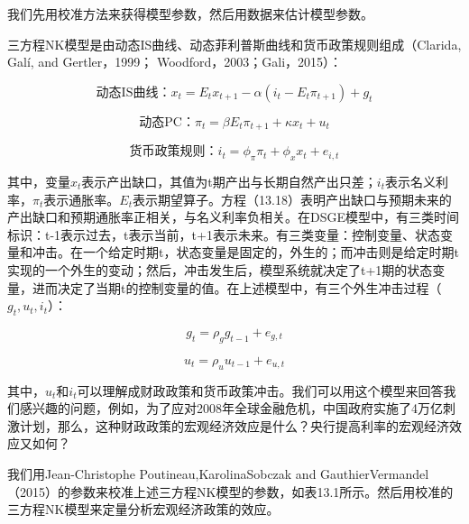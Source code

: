 \documentclass[cn,12pt,math=newtx,citestyle=gb7714-2015,bibstyle=gb7714-2015]{elegantbook}
\begin{document}
	我们先用校准方法来获得模型参数，然后用数据来估计模型参数。
	
	
	三方程NK模型是由动态IS曲线、动态菲利普斯曲线和货币政策规则组成（Clarida, Galí, and Gertler，1999； Woodford，2003；Gali，2015）：
	
	\begin{equation}
		\text{动态IS曲线：}x_t = E_t x_{t+1} - \alpha(i_t - E_t\pi_{t+1} )+ g_t
	\end{equation}
	
	
	\begin{equation}
		\text{动态PC：}\pi_t =\beta E_t \pi_{t+1} + \kappa x_t + u_t
	\end{equation}
	
	\begin{equation}
		\text{货币政策规则：} i_t =\phi_\pi \pi_{t} + \phi_x x_t+ e_{i,t}
	\end{equation}
	
	其中，变量$x_t$表示产出缺口，其值为t期产出与长期自然产出只差；$i_t$表示名义利率，$\pi_t$表示通胀率。$E_t$表示期望算子。方程（13.18）表明产出缺口与预期未来的产出缺口和预期通胀率正相关，与名义利率负相关。在DSGE模型中，有三类时间标识：t-1表示过去，t表示当前，t+1表示未来。有三类变量：控制变量、状态变量和冲击。在一个给定时期t，状态变量是固定的，外生的；而冲击则是给定时期t实现的一个外生的变动；然后，冲击发生后，模型系统就决定了t+1期的状态变量，进而决定了当期t的控制变量的值。在上述模型中，有三个外生冲击过程（$g_t, u_t, i_{t}$）：
	
	\begin{equation}
		g_t = \rho_g g_{t-1} +e_{g,t}
	\end{equation}

	\begin{equation}
	u_t = \rho_u u_{t-1} +e_{u,t}
\end{equation}
	
	其中，$u_t$和$i_t$可以理解成财政政策和货币政策冲击。我们可以用这个模型来回答我们感兴趣的问题，例如，为了应对2008年全球金融危机，中国政府实施了4万亿刺激计划，那么，这种财政政策的宏观经济效应是什么？央行提高利率的宏观经济效应又如何？
	
	我们用Jean-Christophe Poutineau,KarolinaSobczak and GauthierVermandel（2015）的参数来校准上述三方程NK模型的参数，如表13.1所示。然后用校准的三方程NK模型来定量分析宏观经济政策的效应。
\end{document}
